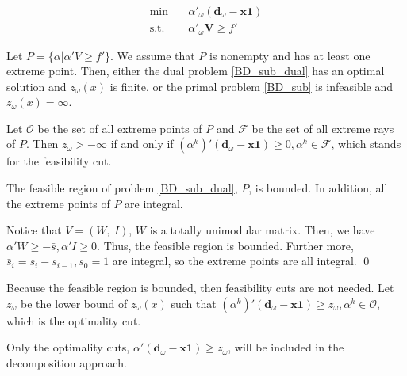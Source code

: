 \begin{equation}\label{BD_sub_dual}
  \begin{aligned}
    \min \quad & \alpha{'}_{\omega} (\mathbf{d}_{\omega}- \mathbf{x} \mathbf{1}) \\
    \text {s.t.} \quad & \alpha{'}_{\omega} \mathbf{V} \geq f{'}
  \end{aligned}
  \end{equation}

Let $P = \{\alpha|\alpha{'}V \geq f{'}\}$. 
We assume that $P$ is nonempty and has at least one extreme point. Then, either the dual problem \eqref{BD_sub_dual} has an optimal solution and $z_{\omega}(x)$ is finite, or the primal problem \eqref{BD_sub} is infeasible and $z_{\omega}(x) = \infty$.  

Let $\mathcal{O}$ be the set of all extreme points of $P$ and $\mathcal{F}$ be the set of all extreme rays of $P$. Then $z_{\omega} > -\infty$ if and only if $(\alpha^{k}){'}(\mathbf{d}_{\omega}- \mathbf{x} \mathbf{1}) \geq 0, \alpha^{k} \in \mathcal{F}$, which stands for the feasibility cut. 

\begin{lem}\label{feasible_region}
  The feasible region of problem \eqref{BD_sub_dual}, $P$, is bounded. In addition, all the extreme points of $P$ are integral.
\end{lem}

\begin{pf}
Notice that $V =(W,~I)$, $W$ is a totally unimodular matrix. Then, we have $\alpha{'}W \geq -\bar{s}, \alpha{'}I \geq 0$. Thus, the feasible region is bounded.
Further more, $\bar{s}_i = s_i - s_{i-1}, s_0 =1$ are integral, so the extreme points are all integral.
\qed
\end{pf}

Because the feasible region is bounded, then feasibility cuts are not needed. Let $z_{\omega}$ be the lower bound of $z_{\omega}(x)$ such that $(\alpha^{k}){'}(\mathbf{d}_{\omega}- \mathbf{x} \mathbf{1}) \geq z_{\omega}, \alpha^k \in \mathcal{O}$, which is the optimality cut.

\begin{corollary}
  Only the optimality cuts, $\alpha{'}(\mathbf{d}_{\omega}- \mathbf{x} \mathbf{1}) \geq z_{\omega}$, will be included in the decomposition approach.
\end{corollary}


